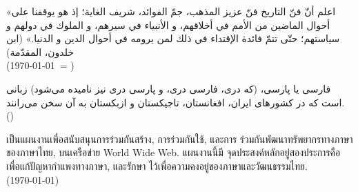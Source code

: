 \documentclass[a4paper]{article}
\begin{document}
\begin{Arabic}[]
«اعلم أنّ فنّ التاريخ فنّ عزيز المذهب، جمّ الفوائد، شريف الغاية؛ إذ هو يوقفنا على أحوال الماضين من الأمم في أخلاقهم، و الأنبياء في سيرهم، و الملوك في دولهم و سياستهم؛ حتّى تتمّ فائدة الإقتداء في ذلك لمن يرومه في أحوال الدين و الدنيا.» (ابن خلدون، المقدّمة)\\
(\today\ = \Hijritoday[0])
\end{Arabic}

\begin{farsi}
فارسی یا پارسی، (که دری، فارسی دری، و پارسی دری نیز نامیده می‌شود) زبانی است که
در کشورهای ایران، افغانستان، تاجیکستان و ازبکستان به آن سخن می‌رانند. \\
(\Jalalitoday)
\end{farsi}

\begin{thai}
เป็น\wbr แผนงานเพื่อ\wbr สนับสนุน\wbr การ\wbr ร่วมกัน\wbr สร้าง, การ\wbr ร่วมกันใช้, และ\wbr การ%
ร่วมกัน\wbr พัฒนา\wbr ทรัพยากร\wbr ทาง\wbr ภาษา\wbr ของ\wbr ภาษา\wbr ไทย, บน\wbr เครือข่าย World Wide Web. แผนงานนี้\wbr มี%
จุด\wbr ประสงค์หลั\wbr กอยู่\wbr สอง\wbr ประการคือ เพื่อแก้ปัญหา\wbr กำ\wbr แพง\wbr ทาง\wbr ภาษา, และรักษา%
ไว้เพื่อ\wbr ความค\wbr งอยู่\wbr ของ\wbr ภาษา\wbr และ\wbr วัฒนธรรม\wbr ไทย. \\
(\today)
\end{thai}
\end{document}
